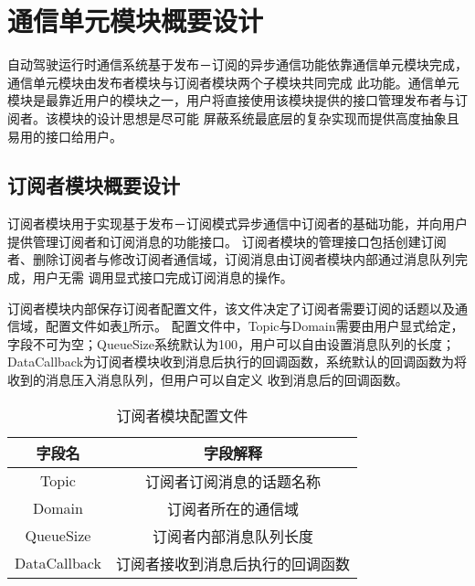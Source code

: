 \section{通信单元模块概要设计}
自动驾驶运行时通信系统基于发布－订阅的异步通信功能依靠通信单元模块完成，通信单元模块由发布者模块与订阅者模块两个子模块共同完成
此功能。通信单元模块是最靠近用户的模块之一，用户将直接使用该模块提供的接口管理发布者与订阅者。该模块的设计思想是尽可能
屏蔽系统最底层的复杂实现而提供高度抽象且易用的接口给用户。
\subsection{订阅者模块概要设计}
订阅者模块用于实现基于发布－订阅模式异步通信中订阅者的基础功能，并向用户提供管理订阅者和订阅消息的功能接口。
订阅者模块的管理接口包括创建订阅者、删除订阅者与修改订阅者通信域，订阅消息由订阅者模块内部通过消息队列完成，用户无需
调用显式接口完成订阅消息的操作。

订阅者模块内部保存订阅者配置文件，该文件决定了订阅者需要订阅的话题以及通信域，配置文件如表\ref{subscriber_config_file}所示。
配置文件中，Topic与Domain需要由用户显式给定，字段不可为空；QueueSize系统默认为100，用户可以自由设置消息队列的长度；
DataCallback为订阅者模块收到消息后执行的回调函数，系统默认的回调函数为将收到的消息压入消息队列，但用户可以自定义
收到消息后的回调函数。
\begin{table}[htb]
  \centering\small
  \caption{订阅者模块配置文件}
  \label{subscriber_config_file}
  \begin{tabular}{cc}
    \toprule
    字段名 & 字段解释 \\
    \midrule
    Topic & 订阅者订阅消息的话题名称\\
    Domain & 订阅者所在的通信域\\
    QueueSize & 订阅者内部消息队列长度\\
    DataCallback & 订阅者接收到消息后执行的回调函数\\
    \bottomrule
  \end{tabular}
\end{table}

